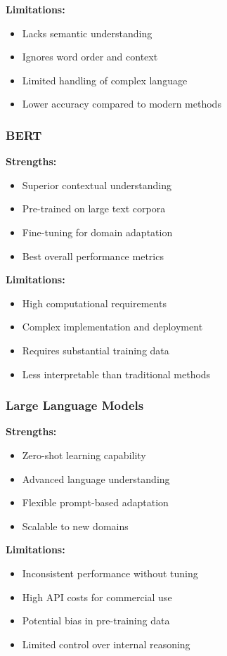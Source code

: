 \documentclass[12pt,a4paper]{article}
\begin{document}
\textbf{Limitations:}
\begin{itemize}
    \item Lacks semantic understanding
    \item Ignores word order and context
    \item Limited handling of complex language
    \item Lower accuracy compared to modern methods
\end{itemize}

\subsubsection{BERT}
\textbf{Strengths:}
\begin{itemize}
    \item Superior contextual understanding
    \item Pre-trained on large text corpora
    \item Fine-tuning for domain adaptation
    \item Best overall performance metrics
\end{itemize}

\textbf{Limitations:}
\begin{itemize}
    \item High computational requirements
    \item Complex implementation and deployment
    \item Requires substantial training data
    \item Less interpretable than traditional methods
\end{itemize}

\subsubsection{Large Language Models}
\textbf{Strengths:}
\begin{itemize}
    \item Zero-shot learning capability
    \item Advanced language understanding
    \item Flexible prompt-based adaptation
    \item Scalable to new domains
\end{itemize}

\textbf{Limitations:}
\begin{itemize}
    \item Inconsistent performance without tuning
    \item High API costs for commercial use
    \item Potential bias in pre-training data
    \item Limited control over internal reasoning
\end{itemize}
\end{document}
